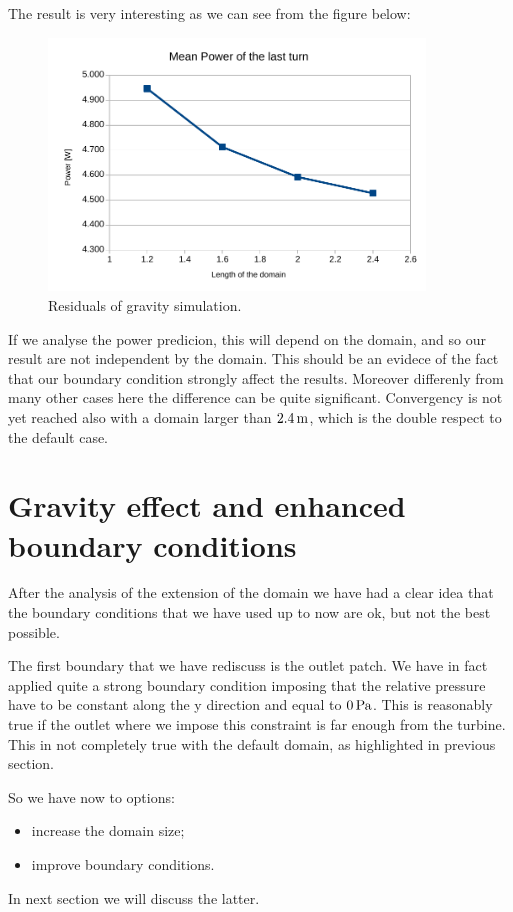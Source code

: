 \documentclass[a4paper,12pt]{article}
\begin{document}
The result is very interesting as we can see from the figure below:
\begin{figure}[H]
\centering
\includegraphics[width=10cm]{images/longmesh/power.pdf}
\caption{Residuals of gravity simulation.}
\end{figure}
If we analyse the power predicion, this will depend on the domain, and so our result are not independent by the domain. This should be an evidece of the fact that our boundary condition strongly affect the results.
Moreover differenly from many other cases here the difference can be quite significant.
Convergency is not yet reached also with a domain larger than $2.4\,\text{m}$, which is the double respect to the default case.%


\section{Gravity effect and enhanced boundary conditions}

After the analysis of the extension of the domain we have had a clear idea that the boundary conditions that we have used up to now are ok, 
but not the best possible.

The first boundary that we have rediscuss is the outlet patch. We have in fact applied quite a strong boundary condition imposing that the relative pressure have to be constant along the y direction and equal to $0\,\text{Pa}$. This is reasonably true if the outlet where we impose this constraint is far enough from the turbine. This in not completely true with the default domain, as highlighted in previous section.

So we have now to options:
\begin{itemize}
\item increase the domain size;
\item improve boundary conditions.
\end{itemize}  
In next section we will discuss the latter.
\end{document}
